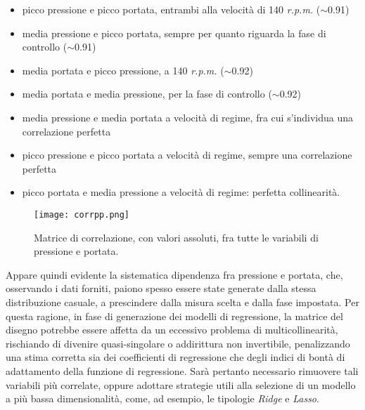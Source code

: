\documentclass[fleqn,10pt]{SelfArx} %
\begin{document}
\begin{itemize}
    \item picco pressione e picco portata, entrambi alla velocità di 140 \textit{r.p.m.} ($\sim$0.91)
    \item media pressione e picco portata, sempre per quanto riguarda la fase di controllo ($\sim$0.91)
    \item media portata e picco pressione, a 140 \textit{r.p.m.} ($\sim$0.92)
    \item media portata e media pressione, per la fase di controllo ($\sim$0.92)
    \item media pressione e media portata a velocità di regime, fra cui s'individua una correlazione perfetta
    \item picco pressione e picco portata a velocità di regime, sempre una correlazione perfetta
    \item picco portata e media pressione a velocità di regime: perfetta collinearità.
\end{itemize}
\begin{figure}[h]
    \centering
    \texttt{[image: corrpp.png]}
    \label{fig:em}
    \caption{Matrice di correlazione, con valori assoluti, fra tutte le variabili di pressione e portata.}
\end{figure}
Appare quindi evidente la sistematica dipendenza fra pressione e portata, che, osservando i dati forniti, paiono spesso essere state generate dalla stessa distribuzione casuale, a prescindere dalla misura scelta e dalla fase impostata. Per questa ragione, in fase di generazione dei modelli di regressione, la matrice del disegno potrebbe essere affetta da un eccessivo problema di multicollinearità, rischiando di divenire quasi-singolare o addirittura non invertibile, penalizzando una stima corretta sia dei coefficienti di regressione che degli indici di bontà di adattamento della funzione di regressione. Sarà pertanto necessario rimuovere tali variabili più correlate, oppure adottare strategie utili alla selezione di un modello a più bassa dimensionalità, come, ad esempio, le tipologie \textit{Ridge} e \textit{Lasso}.
\end{document}

